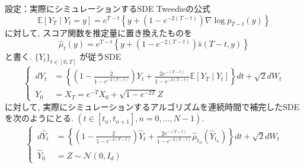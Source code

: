 \documentclass[11pt]{beamer}
\newcommand{\E}{\mathbb{E}}
\newcommand{\StdNormal}{\mathcal{N}(0,I_d)}
\begin{document}
\begin{frame}[t]{設定：実際にシミュレーションするSDE}
  Tweedieの公式
  \begin{equation*}
    \E[Y_T\mid Y_t=y]
    =e^{T-t}\left\{y+(1-e^{-2(T-t)})\nabla\log{p_{T-t}(y)}\right\}
  \end{equation*}
  に対して, スコア関数を推定量に置き換えたものを
  \begin{equation*}
    \hat{\mu}_t(y)=e^{T-t}\left\{y+(1-e^{-2(T-t)})\hat{s}(T-t,y)\right\}
  \end{equation*}
  と書く. $\{Y_t\}_{t\in[0,T]}$ が従うSDE
  \begingroup
    \small
    \begin{equation*}
      \left\{ \,
        \begin{aligned}
          dY_t &={} \left\{\left(1-\frac{2}{1-e^{-2(T-t)}}\right)Y_t
            +\frac{2e^{-(T-t)}}{1-e^{-2(T-t)}}\E[Y_T\mid Y_t]\right\}dt+\sqrt{2}dW_t \\
          Y_0 &= X_T =e^{-T}X_0+\sqrt{1-e^{-2T}}Z
        \end{aligned}
      \right.
    \end{equation*}
  \endgroup
  {\small
    に対して, 実際にシミュレーションするアルゴリズムを連続時間で補完したSDEを次のようにとる.  $(t\in[t_n,t_{n+1}], n=0,\ldots,N-1)$.
  }
  \begingroup
    \small
    \begin{equation*}
      \left\{ \,
        \begin{aligned}
          d\hat{Y}_t &={} \left\{\left(1-\frac{2}{1-e^{-2(T-t)}}\right)\hat{Y}_t
            +\frac{2e^{-(T-t)}}{1-e^{-2(T-t)}}\hat{\mu}_{t_n}(\hat{Y}_{t_n})\right\}dt+\sqrt{2}dW_t \\
          \hat{Y}_0 &=Z\sim \StdNormal
        \end{aligned}
      \right.
    \end{equation*}
  \endgroup
\end{frame}
\end{document}

